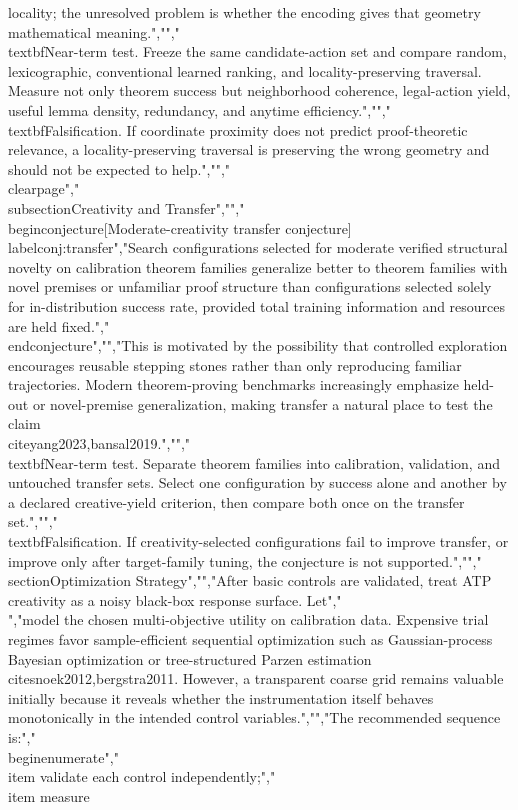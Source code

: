 {{{locality; the unresolved problem is whether the encoding gives that geometry mathematical meaning.","","\\textbf{Near-term test.} Freeze the same candidate-action set and compare random, lexicographic, conventional learned ranking, and locality-preserving traversal. Measure not only theorem success but neighborhood coherence, legal-action yield, useful lemma density, redundancy, and anytime efficiency.","","\\textbf{Falsification.} If coordinate proximity does not predict proof-theoretic relevance, a locality-preserving traversal is preserving the wrong geometry and should not be expected to help.","","\\clearpage","\\subsection{Creativity and Transfer}","","\\begin{conjecture}[Moderate-creativity transfer conjecture]\\label{conj:transfer}","Search configurations selected for moderate verified structural novelty on calibration theorem families generalize better to theorem families with novel premises or unfamiliar proof structure than configurations selected solely for in-distribution success rate, provided total training information and resources are held fixed.","\\end{conjecture}","","This is motivated by the possibility that controlled exploration encourages reusable stepping stones rather than only reproducing familiar trajectories. Modern theorem-proving benchmarks increasingly emphasize held-out or novel-premise generalization, making transfer a natural place to test the claim \\cite{yang2023,bansal2019}.","","\\textbf{Near-term test.} Separate theorem families into calibration, validation, and untouched transfer sets. Select one configuration by success alone and another by a declared creative-yield criterion, then compare both once on the transfer set.","","\\textbf{Falsification.} If creativity-selected configurations fail to improve transfer, or improve only after target-family tuning, the conjecture is not supported.","","\\section{Optimization Strategy}","","After basic controls are validated, treat ATP creativity as a noisy black-box response surface. Let","\\[","\\widehat{U}(u)","\\]","model the chosen multi-objective utility on calibration data. Expensive trial regimes favor sample-efficient sequential optimization such as Gaussian-process Bayesian optimization or tree-structured Parzen estimation \\cite{snoek2012,bergstra2011}. However, a transparent coarse grid remains valuable initially because it reveals whether the instrumentation itself behaves monotonically in the intended control variables.","","The recommended sequence is:","\\begin{enumerate}","\\item validate each control independently;","\\item measure }}}
